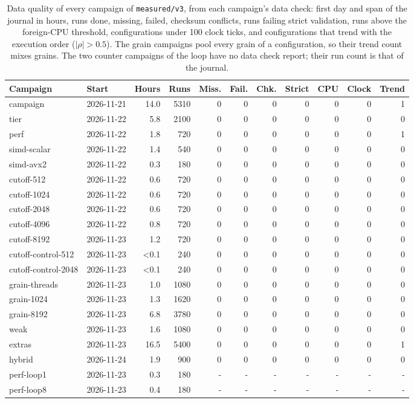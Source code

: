 \begin{table}[htbp]
\caption{Data quality of every campaign of \texttt{measured/v3}, from each campaign's data check: first day and span of the journal in hours, runs done, missing, failed, checksum conflicts, runs failing strict validation, runs above the foreign-CPU threshold, configurations under 100 clock ticks, and configurations that trend with the execution order ($|\rho|>0.5$). The grain campaigns pool every grain of a configuration, so their trend count mixes grains. The two counter campaigns of the loop have no data check report; their run count is that of the journal.}\label{tab:quality}
\centering\footnotesize
\begin{tabular}{llrrrrrrrrr}
\toprule
Campaign & Start & Hours & Runs & Miss. & Fail. & Chk. & Strict & CPU & Clock & Trend \\
\midrule
campaign & 2026-11-21 & 14.0 & 5310 & 0 & 0 & 0 & 0 & 0 & 0 & 1 \\
tier & 2026-11-22 & 5.8 & 2100 & 0 & 0 & 0 & 0 & 0 & 0 & 0 \\
perf & 2026-11-22 & 1.8 & 720 & 0 & 0 & 0 & 0 & 0 & 0 & 1 \\
simd-scalar & 2026-11-22 & 1.4 & 540 & 0 & 0 & 0 & 0 & 0 & 0 & 0 \\
simd-avx2 & 2026-11-22 & 0.3 & 180 & 0 & 0 & 0 & 0 & 0 & 0 & 0 \\
cutoff-512 & 2026-11-22 & 0.6 & 720 & 0 & 0 & 0 & 0 & 0 & 0 & 0 \\
cutoff-1024 & 2026-11-22 & 0.6 & 720 & 0 & 0 & 0 & 0 & 0 & 0 & 0 \\
cutoff-2048 & 2026-11-22 & 0.6 & 720 & 0 & 0 & 0 & 0 & 0 & 0 & 0 \\
cutoff-4096 & 2026-11-22 & 0.8 & 720 & 0 & 0 & 0 & 0 & 0 & 0 & 0 \\
cutoff-8192 & 2026-11-23 & 1.2 & 720 & 0 & 0 & 0 & 0 & 0 & 0 & 0 \\
cutoff-control-512 & 2026-11-23 & <0.1 & 240 & 0 & 0 & 0 & 0 & 0 & 0 & 0 \\
cutoff-control-2048 & 2026-11-23 & <0.1 & 240 & 0 & 0 & 0 & 0 & 0 & 0 & 0 \\
grain-threads & 2026-11-23 & 1.0 & 1080 & 0 & 0 & 0 & 0 & 0 & 0 & 0 \\
grain-1024 & 2026-11-23 & 1.3 & 1620 & 0 & 0 & 0 & 0 & 0 & 0 & 0 \\
grain-8192 & 2026-11-23 & 6.8 & 3780 & 0 & 0 & 0 & 0 & 0 & 0 & 0 \\
weak & 2026-11-23 & 1.6 & 1080 & 0 & 0 & 0 & 0 & 0 & 0 & 0 \\
extras & 2026-11-23 & 16.5 & 5400 & 0 & 0 & 0 & 0 & 0 & 0 & 1 \\
hybrid & 2026-11-24 & 1.9 & 900 & 0 & 0 & 0 & 0 & 0 & 0 & 0 \\
perf-loop1 & 2026-11-23 & 0.3 & 180 & - & - & - & - & - & - & - \\
perf-loop8 & 2026-11-23 & 0.4 & 180 & - & - & - & - & - & - & - \\
\bottomrule
\end{tabular}
\end{table}
